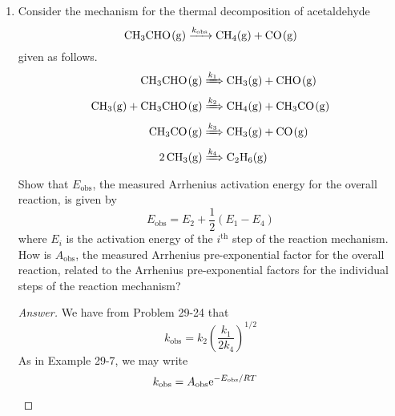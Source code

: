 \documentclass[../psets.tex]{subfiles}
\begin{document}
\begin{enumerate}[label={\textbf{29-\arabic*.}},leftmargin=3.5em]
\begin{proof}[Answer]
\begin{align*}
        \end{align*}
        that
        \begin{align*}
            \dv{\cnc{Cl2CO}}{t} &= k_3\cnc{ClCO}\cnc{Cl2}\\
            &= k_3K_{c,2}\cnc{Cl}\cnc{CO}\cnc{Cl2}\\
            &= k_3K_{c,2}K_{c,1}^{1/2}\cnc{Cl2}^{1/2}\cnc{CO}\cnc{Cl2}\\
            \Aboxed{\dv{\cnc{Cl2CO}}{t} &= \underbrace{k_3\left( \frac{k_2}{k_{-2}} \right)\left( \frac{k_1}{k_{-1}} \right)^{1/2}}_{k_\text{obs}}\cnc{Cl2}^{3/2}\cnc{CO}}
        \end{align*}
    \end{proof}
    \setcounter{enumi}{27}
    \item Consider the mechanism for the thermal decomposition of acetaldehyde
    \begin{equation*}
        \ce{CH3CHO(g) ->[$k_\text{obs}$] CH4(g) + CO(g)}
    \end{equation*}
    given as follows.
    \begin{align*}
        \ce{CH3CHO(g)} &\xRightarrow{k_1} \ce{CH3(g) + CHO(g)}\\
        \ce{CH3(g) + CH3CHO(g)} &\xRightarrow{k_2} \ce{CH4(g) + CH3CO(g)}\\
        \ce{CH3CO(g)} &\xRightarrow{k_3} \ce{CH3(g) + CO(g)}\\
        \ce{2CH3(g)} &\xRightarrow{k_4} \ce{C2H6(g)}
    \end{align*}
    Show that $E_\text{obs}$, the measured Arrhenius activation energy for the overall reaction, is given by
    \begin{equation*}
        E_\text{obs} = E_2+\frac{1}{2}(E_1-E_4)
    \end{equation*}
    where $E_i$ is the activation energy of the $i^\text{th}$ step of the reaction mechanism. How is $A_\text{obs}$, the measured Arrhenius pre-exponential factor for the overall reaction, related to the Arrhenius pre-exponential factors for the individual steps of the reaction mechanism?
    \begin{proof}[Answer]
        We have from Problem 29-24 that
        \begin{equation*}
            k_\text{obs} = k_2\left( \frac{k_1}{2k_4} \right)^{1/2}
        \end{equation*}
        As in Example 29-7, we may write
        \begin{align*}
            k_\text{obs} &= A_\text{obs}\e[-E_\text{obs}/RT]&

\end{align*}
\end{proof}
\end{enumerate}
\end{document}
